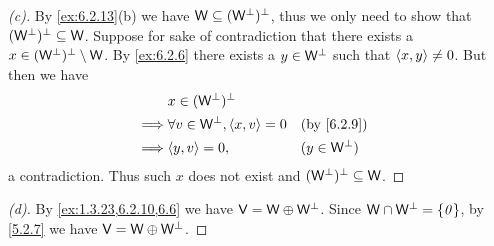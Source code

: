 \begin{proof}[(c)]
  By \cref{ex:6.2.13}(b) we have \(\mathsf{W} \subseteq (\mathsf{W}^{\perp})^{\perp}\), thus we only need to show that \((\mathsf{W}^{\perp})^{\perp} \subseteq \mathsf{W}\).
  Suppose for sake of contradiction that there exists a \(x \in (\mathsf{W}^{\perp})^{\perp} \setminus \mathsf{W}\).
  By \cref{ex:6.2.6} there exists a \(y \in \mathsf{W}^{\perp}\) such that \(\left\langle x, y\right\rangle \neq 0\).
  But then we have
  \begin{align*}
             & x \in (\W^{\perp})^{\perp}                                             \\
    \implies & \forall v \in \W^{\perp}, \inn{x, v} = 0 &  & \text{(by \cref{6.2.9})} \\
    \implies & \inn{y, v} = 0,                          &  & (y \in \W^{\perp})
  \end{align*}
  a contradiction.
  Thus such \(x\) does not exist and \((\mathsf{W}^{\perp})^{\perp} \subseteq \mathsf{W}\).
\end{proof}

\begin{proof}[(d)]
  By \cref{ex:1.3.23,6.2.10,6.6} we have \(\mathsf{V} = \mathsf{W} \oplus \mathsf{W}^{\perp}\).
  Since \(\mathsf{W} \cap \mathsf{W}^{\perp} = \left\lbrace\mathit{0}\right\rbrace\), by \cref{5.2.7} we have \(\mathsf{V} = \mathsf{W} \oplus \mathsf{W}^{\perp}\).
\end{proof}

\begin{ex}\label{ex:6.2.16}

\end{ex}
